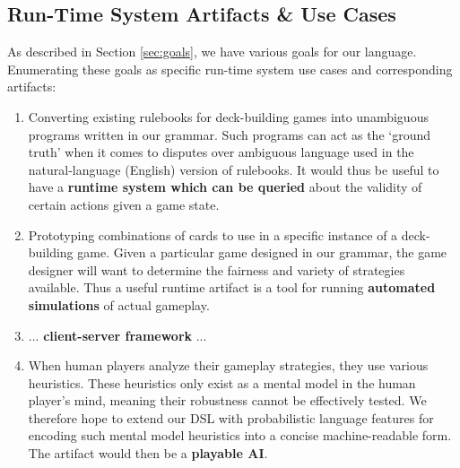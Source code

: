 \documentclass{acm_proc_article-sp}
\begin{document}
\subsection{Run-Time System Artifacts \& Use Cases}
\label{sec:runtime_system}
%

As described in Section \ref{sec:goals}, we have various goals for our
language. Enumerating these goals as specific run-time system use cases
and corresponding artifacts:

\begin{enumerate}
\item Converting existing rulebooks for deck-building games into unambiguous programs written in
our grammar. Such programs can act as the `ground truth' when it comes to disputes over ambiguous
language used in the natural-language (English) version of rulebooks. It would thus be useful to
have a {\bf runtime system which can be queried} about the validity of certain actions given a game state.

\item Prototyping combinations of cards to use in a specific instance of a deck-building game.
Given a particular game designed in our grammar, the game designer will want to determine the
fairness and variety of strategies available. Thus a useful runtime artifact is a tool for
running {\bf automated simulations} of actual gameplay.

\item ... {\bf client-server framework} ...

\item When human players analyze their gameplay strategies, they use various heuristics.
These heuristics only exist as a mental model in the human player's mind, meaning their
robustness cannot be effectively tested. We therefore hope to extend our DSL with probabilistic
language features for encoding such mental model heuristics into a concise machine-readable form.
The artifact would then be a {\bf playable AI}.

\end{enumerate}
\end{document}
